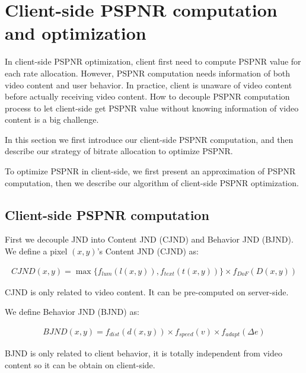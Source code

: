 \section{Client-side PSPNR computation and optimization}

In client-side PSPNR optimization, client first need to compute PSPNR value for each rate allocation. However, PSPNR computation needs information of both video content and user behavior. In practice, client is unaware of video content before actually receiving video content. How to decouple PSPNR computation process to let client-side get PSPNR value without knowing information of video content is a big challenge.



In this section we first introduce our client-side PSPNR computation, and then describe our strategy of bitrate allocation to optimize PSPNR.

To optimize PSPNR in client-side, we first present an approximation of PSPNR computation, then we describe our algorithm of client-side PSPNR optimization.

\subsection{Client-side PSPNR computation}

First we decouple JND into Content JND (CJND) and Behavior JND (BJND). We define a pixel $(x, y)$'s Content JND (CJND) as:

\begin{equation}
\begin{aligned}
CJND(x, y) = \max \{ f_{lum}(l(x, y)) , f_{text}(t(x, y))\} \times f_{DoF}(D(x, y)) \label{CJND}
\end{aligned}
\end{equation}

CJND is only related to video content. It can be pre-computed on server-side.

We define Behavior JND (BJND) as:

\begin{equation}
\begin{aligned}
BJND(x, y) =  f_{dist}(d(x, y)) \times f_{speed}(v) \times f_{adapt}(\Delta e) \label{BJND}
\end{aligned}
\end{equation}

BJND is only related to client behavior, it is totally independent from video content so it can be obtain on client-side. 


